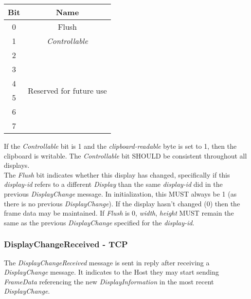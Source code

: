 \documentclass{article}
\begin{document}
    \begin{center}
        \begin{tabular}{|c|c|}
            \hline
            \textbf{Bit} & \textbf{Name}                               \\
            \hline
            0            & Flush                                       \\
            \hline
            1            & \emph{Controllable}                         \\
            \hline
            2            & \multirow{6}{10em}{Reserved for future use} \\
            3            &                                             \\
            4            &                                             \\
            5            &                                             \\
            6            &                                             \\
            7            &                                             \\
            \hline
        \end{tabular}
    \end{center}

    If the \emph{Controllable} bit is 1 and the \emph{clipboard-readable} byte is set to 1, then the clipboard is writable. The \emph{Controllable} bit SHOULD be consistent throughout all displays.\\

    The \emph{Flush} bit indicates whether this display has changed, specifically if this \emph{display-id} refers to a different \emph{Display} than the same \emph{display-id} did in the previous \emph{DisplayChange} message. In initialization, this MUST always be 1 (as there is no previous \emph{DisplayChange}). If the display hasn't changed (0) then the frame data may be maintained. If \emph{Flush} is 0, \emph{width}, \emph{height} MUST remain the same as the previous \emph{DisplayChange} specified for the \emph{display-id}.

    \subsubsection{DisplayChangeReceived - TCP}

    The \emph{DisplayChangeReceived} message is sent in reply after receiving a \emph{DisplayChange} message. It indicates to the Host they may start sending \emph{FrameData} referencing the new \emph{DisplayInformation} in the most recent \emph{DisplayChange}.
\end{document}
